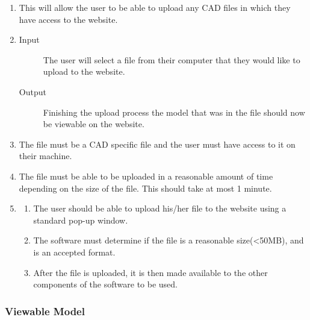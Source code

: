 \documentclass[letterpaper, 10pt, draftclsnofoot, compsoc, onecolumn]{IEEEtran}
\begin{document}
\begin{enumerate}
	\item This will allow the user to be able to upload any CAD files in which they have access to the website.

	\item
	\begin{description} 
		\item[Input] The user will select a file from their computer that they would like to upload to the website. 
		\item[Output] Finishing the upload process the model that was in the file should now be viewable on the website. 
	\end{description}
	
	\item The file must be a CAD specific file and the user must have access to it on their machine. 

	\item	The file must be able to be uploaded in a reasonable amount of time depending on the size 
	of the file. This should take at most 1 minute. 

	\item
	\begin{enumerate}
		\item The user should be able to upload his/her file to the website using a standard pop-up window.
		\item The software must determine if the file is a reasonable size(<50MB), and is an accepted format. 
		\item After the file is uploaded, it is then made available to the other components of the software to be used.
	\end{enumerate}
\end{enumerate}

\subsubsection{Viewable Model}
\end{document}
